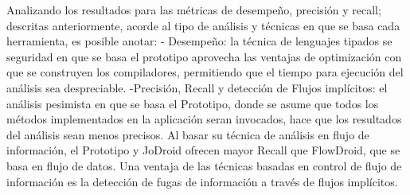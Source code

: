Analizando los resultados para las métricas de desempeño, precisión y recall;
descritas anteriormente, acorde al tipo de análisis y técnicas en que se basa
cada herramienta, es posible anotar:\newline 
- Desempeño: la técnica de lenguajes tipados se seguridad en que se basa el
prototipo aprovecha las ventajas de optimización con que se construyen los
compiladores, permitiendo que el tiempo para ejecución del análisis sea
despreciable.\newline 
-Precisión, Recall y detección de Flujos implícitos: el análisis pesimista en
que se basa el Prototipo, donde se asume que todos los métodos implementados en
la aplicación seran invocados, hace que los resultados del análisis sean menos
precisos.
Al basar su técnica de análisis en flujo de información, el Prototipo y JoDroid
ofrecen mayor Recall que FlowDroid, que se basa en flujo de datos.\newline
Una ventaja de las técnicas basadas en control de flujo de información es la
detección de fugas de información a través de flujos implícitos.

  

